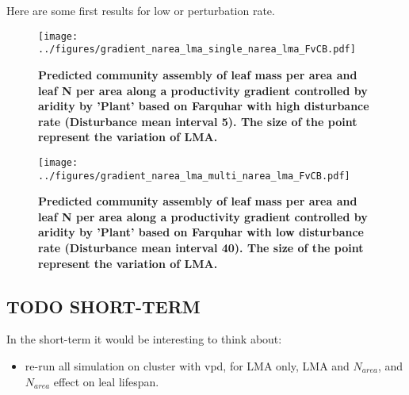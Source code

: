 \documentclass[a4paper,11pt]{article}
\begin{document}
Here are some first results for low or perturbation rate.


\begin{figure}[ht]
\centering
\texttt{[image: ../figures/gradient\_narea\_lma\_single\_narea\_lma\_FvCB.pdf]}
\caption{\textbf{Predicted community assembly of leaf mass per area and leaf N per area along a productivity gradient controlled by aridity by 'Plant' based on Farquhar with high disturbance rate (Disturbance mean interval 5). The size of the point represent the variation of LMA.}
\label{fig:lma_nareaFh}}
\end{figure}


\begin{figure}[ht]
\centering
\texttt{[image: ../figures/gradient\_narea\_lma\_multi\_narea\_lma\_FvCB.pdf]}
\caption{\textbf{Predicted community assembly of leaf mass per area and leaf N per area along a productivity gradient controlled by aridity by 'Plant' based on Farquhar with low disturbance rate (Disturbance mean interval 40). The size of the point represent the variation of LMA.}
\label{fig:lma_nareaFl}}
\end{figure}


\clearpage

\subsection{TODO SHORT-TERM}

In the short-term it would be interesting to think about:

\begin{itemize}

\item re-run all simulation on cluster with vpd, for LMA only, LMA and $N_{area}$, and $N_{area}$ effect on leal lifespan.

\end{itemize}





\end{document}

